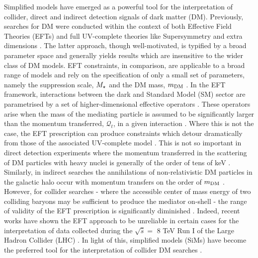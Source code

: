 
Simplified models have emerged as a powerful tool for the interpretation of collider, direct and indirect detection signals of dark matter (DM). Previously,  searches for DM were conducted within the context of both Effective Field Theories (EFTs) \cite{Aad:1363019, ATLAS-CONF-2012-147, CMS-PAS-EXO-12-048, Buckley:2013jwa, Abdallah:1472683, MonoZ, MonoX} and full UV-complete theories like Supersymmetry \cite{ComppMSSM, Aad:2012ms, Aad:2012fqa, Aad:2014wea, SUSY_official_paper} and extra dimensions \cite{}. The latter approach, though well-motivated, is typified by a broad parameter space and generally yields results which are insensitive to the wider class of DM models. EFT constraints, in comparison, are applicable to a broad range of models and rely on the specification of only a small set of parameters, namely the suppression scale, $M_{\star}$ and the DM mass, $m_{\mathrm{DM}}$ \cite{}.
In the EFT framework, interactions between the dark and Standard Model (SM) sector are parametrised by a set of higher-dimensional effective operators \cite{}. These operators arise when the mass of the mediating particle is assumed to be significantly larger than the momentum transferred, $\mathcal{Q}_{t}$, in a given interaction \cite{}. Where this is not the case, the EFT prescription can produce constraints which detour dramatically from those of the associated UV-complete model \cite{Bai:2010hh, DMCons2, Fox:2011fx, Graesser:2011vj, An:2011ck}. This is not so important in direct detection experiments where the momentum transferred in the scattering of DM particles with heavy nuclei is generally of the order of tens of keV \cite{EFTDM, DMCons3}. Similarly, in indirect searches the annihilations of non-relativistic DM particles in the galactic halo occur with momentum transfers on the order of $m_{\mathrm{DM}}$ \cite{}. However, for collider searches - where the accessible center of mass energy of two colliding baryons may be sufficient to produce the mediator on-shell - the range of validity of the EFT prescription is significantly diminished \cite{}. Indeed, recent works have shown the EFT approach to be unreliable in certain cases for the interpretation of data collected during the $\sqrt{\hat{s}} =$ 8 TeV Run I of the Large Hadron Collider (LHC) \cite{}. In light of this, simplified models (SiMs) have become the preferred tool for the interpretation of collider DM searches \cite{Harris:2014hga, Buchmueller:2014yoa}.

